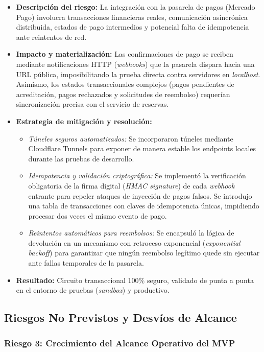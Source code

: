 \begin{itemize}
    \item \textbf{Descripción del riesgo:} La integración con la pasarela de pagos (Mercado Pago) involucra transacciones financieras reales, comunicación asincrónica distribuida, estados de pago intermedios y potencial falta de idempotencia ante reintentos de red.
    \item \textbf{Impacto y materialización:} Las confirmaciones de pago se reciben mediante notificaciones HTTP (\textit{webhooks}) que la pasarela dispara hacia una URL pública, imposibilitando la prueba directa contra servidores en \textit{localhost}. Asimismo, los estados transaccionales complejos (pagos pendientes de acreditación, pagos rechazados y solicitudes de reembolso) requerían sincronización precisa con el servicio de reservas.
    \item \textbf{Estrategia de mitigación y resolución:}
    \begin{itemize}
        \item \textit{Túneles seguros automatizados:} Se incorporaron túneles mediante Cloudflare Tunnels para exponer de manera estable los endpoints locales durante las pruebas de desarrollo.
        \item \textit{Idempotencia y validación criptográfica:} Se implementó la verificación obligatoria de la firma digital (\textit{HMAC signature}) de cada \textit{webhook} entrante para repeler ataques de inyección de pagos falsos. Se introdujo una tabla de transacciones con claves de idempotencia únicas, impidiendo procesar dos veces el mismo evento de pago.
        \item \textit{Reintentos automáticos para reembolsos:} Se encapsuló la lógica de devolución en un mecanismo con retroceso exponencial (\textit{exponential backoff}) para garantizar que ningún reembolso legítimo quede sin ejecutar ante fallas temporales de la pasarela.
    \end{itemize}
    \item \textbf{Resultado:} Circuito transaccional 100\% seguro, validado de punta a punta en el entorno de pruebas (\textit{sandbox}) y productivo.
\end{itemize}

\subsection{Riesgos No Previstos y Desvíos de Alcance}

\subsubsection{Riesgo 3: Crecimiento del Alcance Operativo del MVP}

